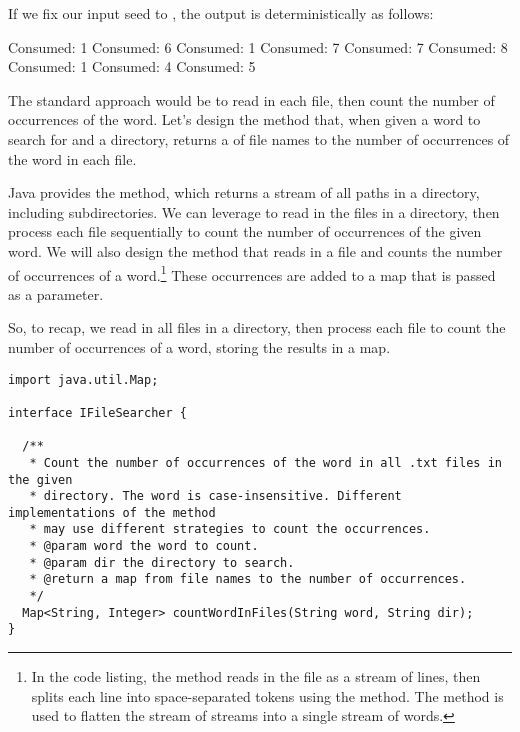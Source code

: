 If we fix our input seed to , the output is deterministically as follows:

\begin{verbnobox}[\small]
Consumed: 1
Consumed: 6
Consumed: 1
Consumed: 7
Consumed: 7
Consumed: 8
Consumed: 1
Consumed: 4
Consumed: 5
\end{verbnobox}

The standard approach would be to read in each file, then count the number of occurrences of the word. 
Let's design the  method that, when given a word to search for and a directory, returns a  of file names to the number of occurrences of the word in each file.

Java provides the  method, which returns a stream of all paths in a directory, including subdirectories.
We can leverage  to read in the  files in a directory, then process each file sequentially to count the number of occurrences of the given word.
We will also design the  method that reads in a file and counts the number of occurrences of a word.\footnote{In the code listing, the  method reads in the file as a stream of lines, then splits each line into space-separated tokens using the  method. The  method is used to flatten the stream of streams into a single stream of words.}
These occurrences are added to a map that is passed as a parameter.

So, to recap, we read in all  files in a directory, then process each file to count the number of occurrences of a word, storing the results in a map.

\newpage
\begin{lstlisting}[language=MyJava]
import java.util.Map;

interface IFileSearcher {

  /**
   * Count the number of occurrences of the word in all .txt files in the given
   * directory. The word is case-insensitive. Different implementations of the method
   * may use different strategies to count the occurrences.
   * @param word the word to count.
   * @param dir the directory to search.
   * @return a map from file names to the number of occurrences.
   */
  Map<String, Integer> countWordInFiles(String word, String dir);
}
\end{lstlisting}

